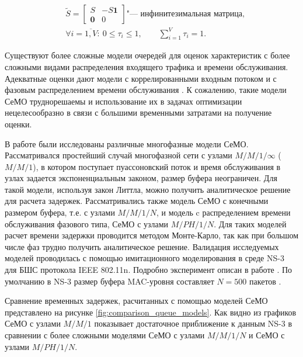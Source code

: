 \begin{displaymath}
	\label{eq:part1_ph_dist}
	\begin{aligned}
		&\tilde{S} = \begin{bmatrix}
			S  & -S\mathbf{1} \\
			\mathbf{0} &  0
		\end{bmatrix} \mbox{"--- инфинитезимальная матрица,}\\
		&\forall i = \overline{1,V}: \: 0 \leq \tau_i \leq 1, \qquad
			\sum\limits_{i=1}^{V} \tau_i = 1.
	\end{aligned}
\end{displaymath}

Существуют более сложные модели очередей для оценок характеристик с более сложными видами распределения входящего трафика и времени обслуживания. Адекватные оценки дают модели с коррелированными входным потоком \cite{VishnevskyDudin2017, Vishnevsky2017, Vishnevsky2016_Methods_of_performance, Larionov2019, Samouylov2022} и с фазовым распределением времени обслуживания \cite{Vishnevsky2017, Vishnevsky2016_Methods_of_performance, Larionov2019, Kawanishi2019, Dogan2021}. К сожалению, такие модели СеМО труднорешаемы и использование их в задачах оптимизации нецелесообразно в связи с большими временными затратами на получение оценки.

В работе были исследованы различные многофазные модели СеМО. Рассматривался простейший случай многофазной сети с узлами $M/M/1/ \infty$ ($M/M/1$), в котором поступает пуассоновский поток и время обслуживания в узлах задается экспоненциальным законом, размер буфера неограничен. Для такой модели, используя закон Литтла, можно получить аналитическое решение для расчета задержек. Рассматривались также модель СеМО с конечными размером буфера, т.е. с узлами $M/M/1/N$, и модель c распределением времени обслуживания фазового типа, СеМО с узлами $M/PH/1/N$. Для таких моделей расчет времени задержки проводится методом Монте-Карло, так как при большом числе фаз трудно получить аналитическое решение. Валидация исследуемых моделей проводилась с помощью имитационного моделирования в среде NS-3 для БШС протокола IEEE 802.11n. Подробно эксперимент описан в работе \cite{Larionov2021}.  По умолчанию в NS-3 размер буфера MAC-уровня составляет $N=500$ пакетов \cite{ns-3}. 

Сравнение временных задержек, расчитанных с помощью моделей СеМО представлено на рисунке \cref{fig:comparison_queue_models}. Как видно из графиков СеМО с узлами $M/M/1$ показывает достаточное приближение к данным NS-3 в сравнении с более сложными моделями СеМО с узлами $M/M/1/N$ и СеМО с узлами $M/PH/1/N$.

